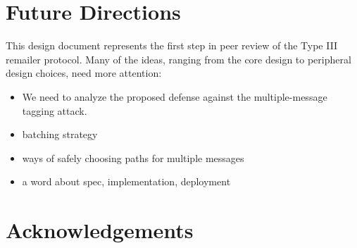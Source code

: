 \documentclass{llncs}
\begin{document}

\section{Future Directions}
\label{sec:conclusion}

This design document represents the first step in peer review of the
Type III remailer protocol. Many of the ideas, ranging from the core
design to peripheral design choices, need more attention:

\begin{itemize}
\item We need to analyze the proposed defense against the multiple-message
tagging attack.
\item batching strategy
\item ways of safely choosing paths for multiple messages
\item a word about spec, implementation, deployment 
\end{itemize}




\section*{Acknowledgements}





\end{document}
